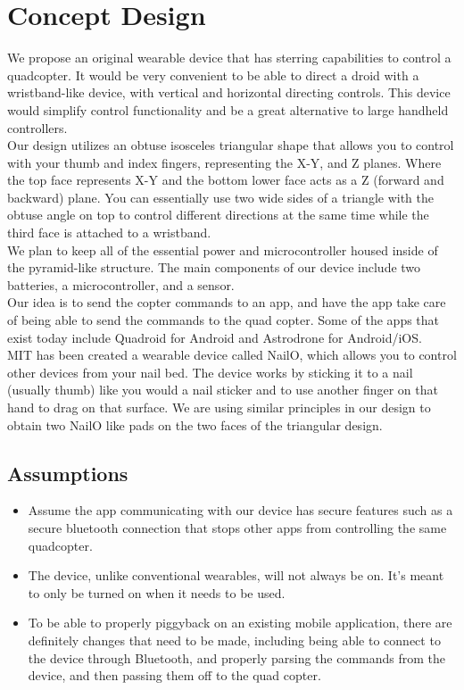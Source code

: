 \documentclass[12pt,letterpaper]{article}
\begin{document}
\section*{Concept Design}
We propose an original wearable device that has sterring capabilities to control a quadcopter. It would be very convenient to be able to direct a droid with a wristband-like device, with vertical and horizontal directing controls. This device would simplify control functionality and be a great alternative to large handheld controllers.\\
Our design utilizes an obtuse isosceles triangular shape that allows you to control with your thumb and index fingers, representing the X-Y, and Z planes. Where the top face represents X-Y and the bottom lower face acts as a Z (forward and backward) plane. You can essentially use two wide sides of a triangle with the obtuse angle on top to control different directions at the same time while the third face is attached to a wristband.\\
We plan to keep all of the essential power and microcontroller housed inside of the pyramid-like structure. The main components of our device include two batteries, a microcontroller, and a sensor.\\
Our idea is to send the copter commands to an app, and have the app take care of being able to send the commands to the quad copter. Some of the apps that exist today include Quadroid for Android and Astrodrone for Android/iOS. \\
MIT has been created a wearable device called NailO, which allows you to control other devices from your nail bed. The device works by sticking it to a nail (usually thumb) like you would a nail sticker and to use another finger on that hand to drag on that surface. We are using similar principles in our design to obtain two NailO like pads on the two faces of the triangular design. \\

\subsection*{Assumptions}
\begin{itemize}
\item Assume the app communicating with our device has secure features such as a secure bluetooth connection that stops other apps from controlling the same quadcopter. 
\item The device, unlike conventional wearables, will not always be on. It’s meant to only be turned on when it needs to be used. 
\item To be able to properly piggyback on an existing  mobile application, there are definitely changes that need to be made, including being able to connect to the device through Bluetooth, and properly parsing the commands from the device, and then passing them off to the quad copter.
\end{itemize}
\end{document}
